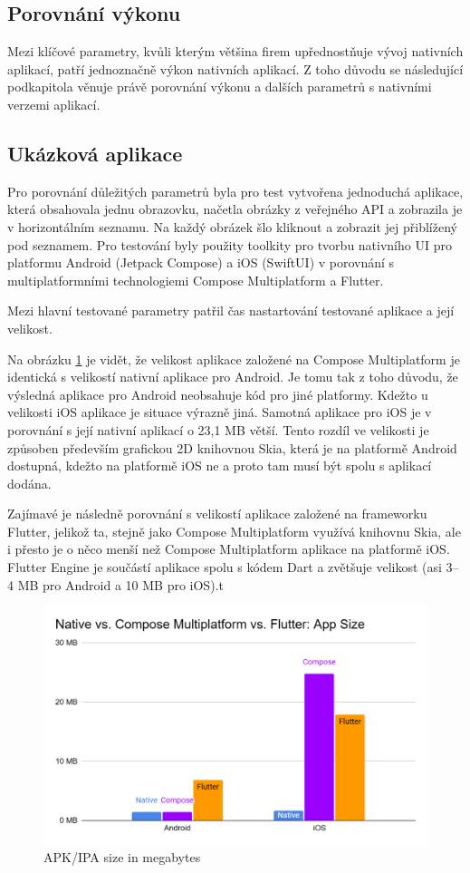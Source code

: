 \subsection{Porovnání výkonu}

Mezi klíčové parametry, kvůli kterým většina firem upřednostňuje vývoj nativních aplikací, patří jednoznačně výkon
nativních aplikací. Z toho důvodu se následující podkapitola věnuje právě porovnání výkonu a dalších parametrů s
nativními verzemi aplikací. 


\subsection*{Ukázková aplikace}

Pro porovnání důležitých parametrů byla pro test vytvořena jednoduchá aplikace, která obsahovala jednu obrazovku, 
načetla obrázky z veřejného API a zobrazila je v horizontálním seznamu. 
Na každý obrázek šlo kliknout a zobrazit jej přiblížený pod seznamem. 
Pro testování byly použity toolkity pro tvorbu nativního UI pro platformu Android (Jetpack Compose) a iOS (SwiftUI)
v porovnání s multiplatformními technologiemi Compose Multiplatform a Flutter.

Mezi hlavní testované parametry patřil čas nastartování testované aplikace a její velikost.


Na obrázku \ref{fig:chart_app_sizes} je vidět, že velikost aplikace založené na Compose Multiplatform je identická
s velikostí nativní aplikace pro Android. Je tomu tak z toho důvodu, že výsledná aplikace pro Android neobsahuje kód 
pro jiné platformy. Kdežto u velikosti iOS aplikace je situace výrazně jiná. Samotná aplikace pro iOS je v porovnání
s její nativní aplikací o 23,1 MB větší. Tento rozdíl ve velikosti je způsoben především grafickou 2D knihovnou Skia,
která je na platformě Android dostupná, kdežto na platformě iOS ne a proto tam musí být spolu s aplikací dodána.

Zajímavé je následně porovnání s velikostí aplikace založené na frameworku Flutter, jelikož ta, stejně jako Compose
Multiplatform využívá knihovnu Skia, ale i přesto je o něco menší než Compose Multiplatform aplikace na platformě iOS.
Flutter Engine je součástí aplikace spolu s kódem Dart a zvětšuje velikost (asi 3–4 MB pro Android a 10 MB pro iOS).t

\begin{figure}[H]
  \centering
  \includegraphics[width=.7\textwidth]{chart_app_sizes.png}
  \caption{APK/IPA size in megabytes}
  \label{fig:chart_app_sizes}
\end{figure}

